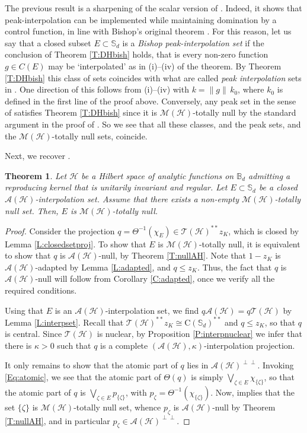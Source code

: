 \documentclass[10pt]{amsart}
\newcommand{\bB}{{\mathbb{B}}}
\newcommand{\bS}{{\mathbb{S}}}
\newcommand{\A}{{\mathcal{A}}}
\renewcommand{\H}{{\mathcal{H}}}
\newcommand{\M}{{\mathcal{M}}}
\newcommand{\T}{{\mathcal{T}}}
\newcommand{\rC}{\mathrm{C}}
\newtheorem{theorem}[lemma]{Theorem}
\theoremstyle{definition}
\begin{document}
The previous result is a sharpening of the scalar version of  \cite[Theorem 8.1]{DH2023}.  
Indeed, it shows that peak-interpolation can be implemented  while maintaining domination by a control function, in line with Bishop's original theorem \cite{bishop1962}. For this reason, let us say that a closed subset $E\subset \bS_d$ is a \emph{Bishop peak-interpolation set} if the conclusion of Theorem \ref{T:DHbish} holds,
that is every non-zero function $g \in C(E)$ may be `interpolated' as in (i)--(iv) of the theorem. 
By Theorem \ref{T:DHbish} this class of sets coincides with what are called {\em peak interpolation} sets in \cite{DH2023}.  One direction of this follows  from (i)--(iv) with $k = \| g \| \, k_0$, where $k_0$ is defined in the first line of the proof above.  Conversely,  any peak set in the sense of \cite{DH2023} satisfies Theorem \ref{T:DHbish} since it is $\M(\H)$-totally null  by the standard argument  in the proof of 
 \cite[Theorem 12.2]{DH2023}.   
 So we see that all these classes, and  the peak sets, and the $\M(\H)$-totally null sets,  coincide.


Next, we recover  \cite[Theorem 10.3]{DH2023}. 

\begin{theorem}\label{T:DH}Let $\H$ be a Hilbert space of analytic functions on $\bB_d$ admitting  a reproducing kernel that is unitarily invariant and regular. 
Let $E\subset \bS_d$ be a closed $\A(\H)$-interpolation set. 
Assume that there exists a non-empty $\M(\H)$-totally null set. Then, $E$ is $\M(\H)$-totally null. 
\end{theorem} 
\begin{proof} 
Consider the projection $q=\Theta^{-1}(\chi_E)\in \T(\H)^{**}z_K$, which is closed by Lemma \ref{L:closedsetproj}. To show that $E$ is $\M(\H)$-totally null, it is equivalent to show that $q$ is $\A(\H)$-null, by Theorem \ref{T:nullAH}. Note that $1-z_K$ is $\A(\H)$-adapted by Lemma \ref{L:adapted}, and $q\leq z_K$. Thus, the fact that $q$ is $\A(\H)$-null will follow from Corollary \ref{C:adapted}, once we verify all the required conditions.

Using that $E$ is an $\A(\H)$-interpolation set, we find %
 $q\A(\H)=q\T(\H)$  by Lemma \ref{L:interpset}.
Recall that $\T(\H)^{**}z_K \cong \rC(\mathbb{S}_d)^{**}$ and $q\leq z_K$, so that $q$ is central.
Since $\T(\H)$ is nuclear, by Proposition \ref{P:interpnuclear} we infer that there is $\kappa>0$ such that $q$ is a complete $(\A(\H),\kappa)$-interpolation projection. 


It only remains to show that the atomic part of $q$ lies in $\A(\H)^{\perp\perp}$. Invoking \eqref{Eq:atomic}, we see that the atomic part of $\Theta(q)$ is simply $\bigvee_{\zeta\in E} \chi_{\{\zeta\}}$, so that the atomic part of $q$ is $\bigvee_{\zeta\in E} p_{\{\zeta\}}$, with $p_\zeta=\Theta^{-1}(\chi_{\{\zeta\}})$. Now,  \cite[Lemma 9.1]{DH2023} implies that the set $\{\zeta\}$ is $\M(\H)$-totally null set, whence $p_\zeta$ is $\A(\H)$-null by Theorem \ref{T:nullAH}, and in particular $p_\zeta\in \A(\H)^{\perp\perp}$.
\end{proof}
\end{document}
